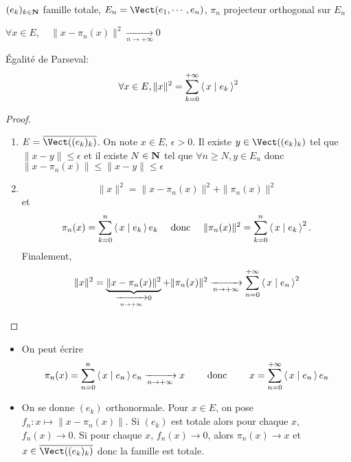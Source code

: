 \begin{thm}
    \Hyp $(e_k)_{k \in  \mathbf N}$ famille totale, $E_n=\Vect(e_1, \cdots , e_n)$, $\pi_n$ projecteur orthogonal sur $E_n$
     \begin{concenum}
     \item $\forall  x \in  E, \quad  \|x-\pi_n(x)\|^2 \xrightarrow[n\to+\infty]{}0$
     \item Égalité de Parseval: \[
     \forall  x \in  E, \|x\|^2 = \sum_{k=0}^{+\infty} \scalar{x}{e_k} ^2 
     \] 
    \end{concenum}
\end{thm}

\begin{proof}~
\begin{enumerate}
    \item $E= \bar{\Vect((e_k)_k)}$. On note $x \in  E$, $\epsilon>0$. Il existe $y \in  \Vect((e_k)_k)$ tel que $\|x-y\|\leq \epsilon$ et il existe $N \in  \mathbf N$ tel que $\forall  n\geq N, y \in  E_n$ donc $\|x-\pi_n(x)\|\leq \|x-y\|\leq \epsilon$
    \item \[
            \|x\|^2 = \|x-\pi_n(x)\|^2 + \|\pi_n(x)\|^2 
    \]
    et \[
        \pi_n(x)=\sum_{k=0}^n \scalar{x}{e_k} e_k \quad \text{ donc } \quad  \|\pi_n(x)\|^2 =\sum_{k=0}^n \scalar{x}{e_k} ^2 .
    \] 
    Finalement, \[
        \|x\|^2 = \underbrace{\|x-\pi_n(x)\|^2}_{\xrightarrow[n\to+\infty]{}0} +\|\pi_n(x)\|^2 \xrightarrow[n\to+\infty]{} \sum_{n=0}^{+\infty} \scalar{x}{e_n} ^2 
    \] 
\end{enumerate}
\end{proof}

\begin{rem}
    \begin{itemize}
        \item On peut écrire \[
                \pi_n(x)= \sum_{n=0}^{n} \scalar{x}{e_n} e_n \xrightarrow[n\to+\infty]{}x \qquad  \text{ donc } \qquad  x= \sum_{n=0}^{+\infty} \scalar{x}{e_n} e_n
        \] 
    \item On se donne $(e_k)$ orthonormale. Pour  $x \in  E$, on pose $f_n:x\longmapsto \|x-\pi_n(x)\|$. Si $(e_k)$ est totale alors pour chaque  $x$,  $f_n(x) \xrightarrow[\hspace{1em}]{}0$. Si pour chaque $x$,  $f_n(x) \xrightarrow[\hspace{1em}]{}0$, alors $ \pi_n(x) \xrightarrow[\hspace{1em}]{}x$ et $x \in  \bar{ \Vect((e_k)_k) }$ donc la famille est totale.
    \end{itemize}
\end{rem}

